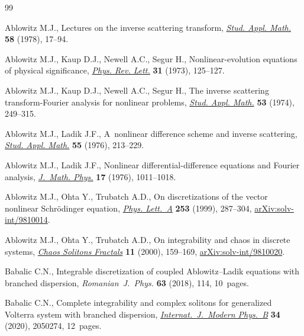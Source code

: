 \documentclass[pdftex]{sigma}
\numberwithin{equation}{section}
\begin{document}
\begin{thebibliography}{99}
\footnotesize\itemsep=0pt

Ablowitz M.J., Lectures on the inverse scattering transform,
 \href{https://doi.org/10.1002/sapm197858117}{\textit{Stud. Appl.
 Math.}} \textbf{58} (1978), 17--94.

Ablowitz M.J., Kaup D.J., Newell A.C., Segur H., Nonlinear-evolution equations
 of physical significance,
 \href{https://doi.org/10.1103/PhysRevLett.31.125}{\textit{Phys. Rev. Lett.}}
 \textbf{31} (1973), 125--127.

Ablowitz M.J., Kaup D.J., Newell A.C., Segur H., The inverse scattering
 transform-{F}ourier analysis for nonlinear problems,
 \href{https://doi.org/10.1002/sapm1974534249}{\textit{Stud. Appl. Math.}}
 \textbf{53} (1974), 249--315.

Ablowitz M.J., Ladik J.F., A~nonlinear difference scheme and inverse
 scattering, \href{https://doi.org/10.1002/sapm1976553213}{\textit{Stud. Appl.
 Math.}} \textbf{55} (1976), 213--229.

Ablowitz M.J., Ladik J.F., Nonlinear differential-difference equations and
 {F}ourier analysis, \href{https://doi.org/10.1063/1.523009}{\textit{J.~Math.
 Phys.}} \textbf{17} (1976), 1011--1018.

Ablowitz M.J., Ohta Y., Trubatch A.D., On discretizations of the vector
 nonlinear {S}chr\"odinger equation,
 \href{https://doi.org/10.1016/S0375-9601(99)00048-1}{\textit{Phys. Lett.~A}}
 \textbf{253} (1999), 287--304,
 \href{http://arxiv.org/abs/solv-int/9810014}{arXiv:solv-int/9810014}.

Ablowitz M.J., Ohta Y., Trubatch A.D., On integrability and chaos in discrete
 systems, \href{https://doi.org/10.1016/S0960-0779(98)00280-X}{\textit{Chaos
 Solitons Fractals}} \textbf{11} (2000), 159--169,
 \href{http://arxiv.org/abs/solv-int/9810020}{arXiv:solv-int/9810020}.

Babalic C.N., Integrable discretization of coupled {A}blowitz--{L}adik
 equations with branched dispersion, \textit{Romanian~J.~Phys.} \textbf{63}
 (2018), 114, 10~pages.

Babalic C.N., Complete integrability and complex solitons for generalized
 {V}olterra system with branched dispersion,
 \href{https://doi.org/10.1142/S0217979220502744}{\textit{Internat.~J.~Modern
 Phys.~B}} \textbf{34} (2020), 2050274, 12~pages.


\end{thebibliography}
\end{document}
